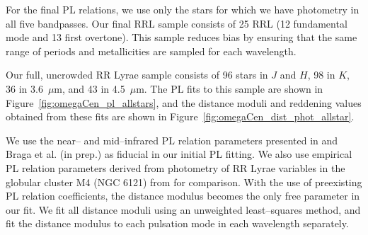 \documentclass[a4paper,fleqn,usenatbib]{mnras}
\begin{document}





For the final PL relations, we use only the stars for which we have photometry in all five bandpasses. Our final RRL sample consists of 25 RRL (12 fundamental mode and 13 first overtone). This sample reduces bias by ensuring that the same range of periods and metallicities are sampled for each wavelength.

Our full, uncrowded RR Lyrae sample consists of 96 stars in $J$ and $H$, 98 in $K$, 36 in 3.6~$\mu$m, and 43 in 4.5~$\mu$m. The PL fits to this sample are shown in Figure~\ref{fig:omegaCen_pl_allstars}, and the distance moduli and reddening values obtained from these fits are shown in Figure~\ref{fig:omegaCen_dist_phot_allstar}.

We use the near-- and mid--infrared PL relation parameters presented in \citet{2015ApJ...808...50M} and Braga et al. (in prep.) as fiducial in our initial PL fitting. We also use empirical PL relation parameters derived from photometry of RR Lyrae variables in the globular cluster M4 (NGC 6121) from \citet{2015arXiv150507858N} for comparison. With the use of preexisting PL relation coefficients, the distance modulus becomes the only free parameter in our fit. We fit all distance moduli using an unweighted least--squares method, and fit the distance modulus to each pulsation mode in each wavelength separately.
\end{document}
